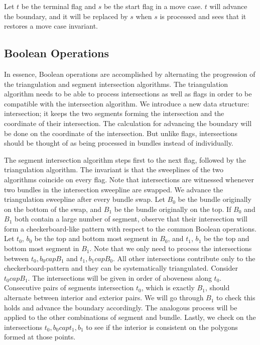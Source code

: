 \documentclass[11pt]{article}
\begin{document}
Let $t$ be the terminal flag and $s$ be the start flag in a move case.
$t$ will advance the boundary, and it will be replaced by $s$ when $s$ is processed and sees that it restores a move case invariant.


\subsection{Boolean Operations}
In essence, Boolean operations are accomplished by alternating the progression of the triangulation and segment intersection algorithms.
The triangulation algorithm needs to be able to process intersections as well as flags in order to be compatible with the intersection algorithm.
We introduce a new data structure: intersection; it keeps the two segments forming the intersection and the coordinate of their intersection.
The calculation for advancing the boundary will be done on the coordinate of the intersection.
But unlike flags, intersections should be thought of as being processed in bundles instead of individually.

The segment intersection algorithm steps first to the next flag, followed by the triangulation algorithm.
The invariant is that the sweeplines of the two algorithms coincide on every flag.
Note that intersections are witnessed whenever two bundles in the intersection sweepline are swapped.
We advance the triangulation sweepline after every bundle swap.
Let $B_0$ be the bundle originally on the bottom of the swap, and $B_1$ be the bundle originally on the top.
If $B_0$ and $B_1$ both contain a large number of segment, observe that their intersection will form a checkerboard-like pattern with respect to the common Boolean operations. 
Let $t_0$, $b_0$ be the top and bottom most segment in $B_0$, and $t_1$, $b_1$ be the top and bottom most segment in $B_1$.
Note that we only need to process the intersections between ${t_0,b_0} cap B_1$ and ${t_1,b_1} cap B_0$.
All other intersections contribute only to the checkerboard-pattern and they can be systematically triangulated.
Consider $t_0 cap B_1$.
The intersections will be given in order of aboveness along $t_0$.
Consecutive pairs of segments intersection $t_0$, which is exactly $B_1$, should alternate between interior and exterior pairs.
We will go through $B_1$ to check this holds and advance the boundary accordingly.
The analogous process will be applied to the other combinations of segment and bundle.
Lastly, we check on the intersections ${t_0,b_0} cap {t_1,b_1}$ to see if the interior is consistent on the polygons formed at those points.
\end{document}
